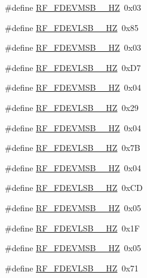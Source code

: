 \begin{DoxyCompactItemize}
\item 
\#define \mbox{\hyperlink{sx1276_regs-_fsk_8h_a2727b4b04f0a27d9f370c8f2b47e81fb}{R\+F\+\_\+\+F\+D\+E\+V\+M\+S\+B\+\_\+\_\+\+HZ}}~0x03
\item 
\#define \mbox{\hyperlink{sx1276_regs-_fsk_8h_a01b1b43aab91e76e84d00af78699ceba}{R\+F\+\_\+\+F\+D\+E\+V\+L\+S\+B\+\_\+\_\+\+HZ}}~0x85
\item 
\#define \mbox{\hyperlink{sx1276_regs-_fsk_8h_a0ca702dda690369e62b5225d3e5425e8}{R\+F\+\_\+\+F\+D\+E\+V\+M\+S\+B\+\_\+\_\+\+HZ}}~0x03
\item 
\#define \mbox{\hyperlink{sx1276_regs-_fsk_8h_ab739890a1c4948ba9df80139f9e90c66}{R\+F\+\_\+\+F\+D\+E\+V\+L\+S\+B\+\_\+\_\+\+HZ}}~0x\+D7
\item 
\#define \mbox{\hyperlink{sx1276_regs-_fsk_8h_a1d9bb9563e152c76f7cbb9df5e1b36c4}{R\+F\+\_\+\+F\+D\+E\+V\+M\+S\+B\+\_\+\_\+\+HZ}}~0x04
\item 
\#define \mbox{\hyperlink{sx1276_regs-_fsk_8h_a8036d3d91106128102f59ddecacd4dc3}{R\+F\+\_\+\+F\+D\+E\+V\+L\+S\+B\+\_\+\_\+\+HZ}}~0x29
\item 
\#define \mbox{\hyperlink{sx1276_regs-_fsk_8h_a3e130dcdc84aa5685b7bc35edf6027f2}{R\+F\+\_\+\+F\+D\+E\+V\+M\+S\+B\+\_\+\_\+\+HZ}}~0x04
\item 
\#define \mbox{\hyperlink{sx1276_regs-_fsk_8h_af2c378fd0b423a7ab42424b045402936}{R\+F\+\_\+\+F\+D\+E\+V\+L\+S\+B\+\_\+\_\+\+HZ}}~0x7B
\item 
\#define \mbox{\hyperlink{sx1276_regs-_fsk_8h_a95625bf09af0cd2a50f00f182a14746d}{R\+F\+\_\+\+F\+D\+E\+V\+M\+S\+B\+\_\+\_\+\+HZ}}~0x04
\item 
\#define \mbox{\hyperlink{sx1276_regs-_fsk_8h_a556565ac523c78650661dce1450dcaf7}{R\+F\+\_\+\+F\+D\+E\+V\+L\+S\+B\+\_\+\_\+\+HZ}}~0x\+CD
\item 
\#define \mbox{\hyperlink{sx1276_regs-_fsk_8h_af8cf1be1a66c7f6f63c4c73a2603657a}{R\+F\+\_\+\+F\+D\+E\+V\+M\+S\+B\+\_\+\_\+\+HZ}}~0x05
\item 
\#define \mbox{\hyperlink{sx1276_regs-_fsk_8h_a28c9def64a8f7e81619124df236fb932}{R\+F\+\_\+\+F\+D\+E\+V\+L\+S\+B\+\_\+\_\+\+HZ}}~0x1F
\item 
\#define \mbox{\hyperlink{sx1276_regs-_fsk_8h_a357181556a2104789f589fa736b3fbad}{R\+F\+\_\+\+F\+D\+E\+V\+M\+S\+B\+\_\+\_\+\+HZ}}~0x05
\item 
\#define \mbox{\hyperlink{sx1276_regs-_fsk_8h_abd3148b49d4c38af8373bd6915742f61}{R\+F\+\_\+\+F\+D\+E\+V\+L\+S\+B\+\_\+\_\+\+HZ}}~0x71

\end{DoxyCompactItemize}
